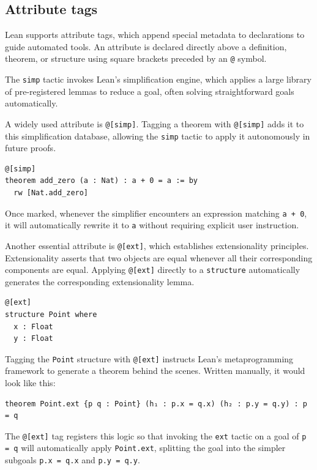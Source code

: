 \subsection{Attribute tags}
\label{sec: tag_ext_simp}

Lean supports attribute tags, which append special metadata to declarations
to guide automated tools. An attribute is declared directly above a
definition, theorem, or structure using square brackets preceded by an
\lstinline|@| symbol.

The \lstinline|simp| tactic invokes Lean's simplification engine, which applies
a large library of pre-registered lemmas to reduce a goal, often solving
straightforward goals automatically.

A widely used attribute is \lstinline|@[simp]|. Tagging a theorem with \lstinline|@[simp]| adds it to this simplification database, allowing the \lstinline|simp| tactic to apply it autonomously in future proofs.

\begin{lstlisting}[language=Lean]
@[simp]
theorem add_zero (a : Nat) : a + 0 = a := by
  rw [Nat.add_zero]
\end{lstlisting}

Once marked, whenever the simplifier encounters an expression matching \lstinline|a + 0|, it will automatically rewrite it to \lstinline|a| without requiring explicit user instruction.

Another essential attribute is \lstinline|@[ext]|, which establishes extensionality principles. Extensionality asserts that two objects are equal whenever all their corresponding components are equal. Applying \lstinline|@[ext]| directly to a \lstinline|structure| automatically generates the corresponding extensionality lemma.

\begin{lstlisting}[language=Lean]
@[ext]
structure Point where
  x : Float
  y : Float
\end{lstlisting}

Tagging the \lstinline|Point| structure with \lstinline|@[ext]| instructs Lean's metaprogramming framework to generate a theorem behind the scenes. Written manually, it would look like this:

\begin{lstlisting}[language=Lean]
theorem Point.ext {p q : Point} (h₁ : p.x = q.x) (h₂ : p.y = q.y) : p = q
\end{lstlisting}

The \lstinline|@[ext]| tag registers this logic so that invoking the \lstinline|ext| tactic on a goal of \lstinline|p = q| will automatically apply \lstinline|Point.ext|, splitting the goal into the simpler subgoals \lstinline|p.x = q.x| and \lstinline|p.y = q.y|.

